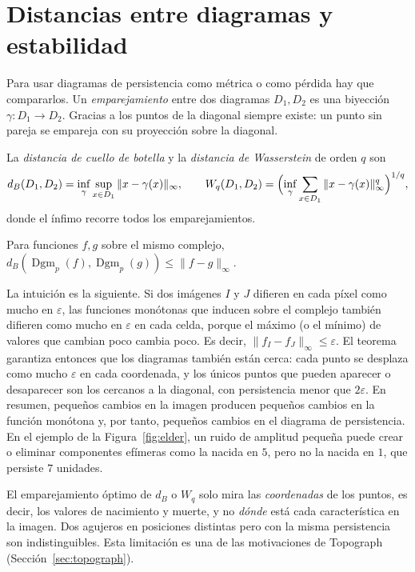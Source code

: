\section{Distancias entre diagramas y estabilidad}
\label{sec:distancias}

Para usar diagramas de persistencia como métrica o como pérdida hay que
compararlos. Un \emph{emparejamiento} entre dos diagramas $D_1,D_2$ es una
biyección $\gamma:D_1\to D_2$. Gracias a los puntos de la diagonal siempre
existe: un punto sin pareja se empareja con su proyección sobre la diagonal.

\begin{definicion}
La \emph{distancia de cuello de botella} y la \emph{distancia de
Wasserstein} de orden $q$ son
\[
  d_B(D_1,D_2)=\inf_{\gamma}\sup_{x\in D_1}\|x-\gamma(x)\|_\infty,
  \qquad
  W_q(D_1,D_2)=\Bigl(\inf_{\gamma}\sum_{x\in D_1}\|x-\gamma(x)\|_\infty^q\Bigr)^{1/q},
\]
donde el ínfimo recorre todos los emparejamientos.
\end{definicion}

\begin{teorema}
Para funciones $f,g$ sobre el mismo complejo,
$d_B(\operatorname{Dgm}_p(f),\operatorname{Dgm}_p(g))\le\|f-g\|_\infty$.
\end{teorema}

La intuición es la siguiente. Si dos imágenes $I$ y $J$ difieren en cada
píxel como mucho en $\varepsilon$, las funciones monótonas que inducen
sobre el complejo también difieren como mucho en $\varepsilon$ en cada
celda, porque el máximo (o el mínimo) de valores que cambian poco cambia
poco. Es decir, $\|f_I-f_J\|_\infty\le\varepsilon$. El teorema garantiza
entonces que los diagramas también están cerca: cada punto se desplaza
como mucho $\varepsilon$ en cada coordenada, y los únicos puntos que
pueden aparecer o desaparecer son los cercanos a la diagonal, con
persistencia menor que $2\varepsilon$. En resumen, pequeños cambios en la
imagen producen pequeños cambios en la función monótona y, por tanto,
pequeños cambios en el diagrama de persistencia. En el ejemplo de la
Figura~\ref{fig:elder}, un ruido de amplitud pequeña puede crear o
eliminar componentes efímeras como la nacida en $5$, pero no la nacida en
$1$, que persiste $7$ unidades.

\begin{observacion}
El emparejamiento óptimo de $d_B$ o $W_q$ solo mira las \emph{coordenadas}
de los puntos, es decir, los valores de nacimiento y muerte, y no
\emph{dónde} está cada característica en la imagen. Dos agujeros en
posiciones distintas pero con la misma persistencia son indistinguibles.
Esta limitación es una de las motivaciones de Topograph
(Sección~\ref{sec:topograph}).
\end{observacion}

